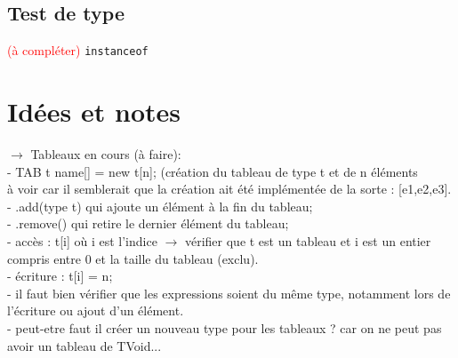 \documentclass{article}
\begin{document}
\subsection{Test de type}
\textcolor{red}{(à compléter)}
\texttt{instanceof}
\section{Idées et notes}
$\rightarrow$ Tableaux en cours (à faire):\\
- TAB t name[] = new t[n]; (création du tableau de type t et de n éléments\\
à voir car il semblerait que la création ait été implémentée de la sorte : [e1,e2,e3].\\
- .add(type t) qui ajoute un élément à la fin du tableau;\\
- .remove() qui retire le dernier élément du tableau;\\
- accès : t[i] où i est l'indice $\rightarrow$ vérifier que t est un tableau et i est un entier compris entre 0 et la taille du tableau (exclu).\\
- écriture : t[i] = n; \\
- il faut bien vérifier que les expressions soient du même type, notamment lors de l'écriture ou ajout d'un élément.\\
- peut-etre faut il créer un nouveau type pour les tableaux ? car on ne peut pas avoir un tableau de TVoid...
\end{document}
